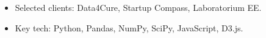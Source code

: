 \documentclass[10pt,a4paper,ragged2e,withhyper]{altacv}
\begin{document}
\begin{paracol}{2}
\divider

\begin{itemize}
\item Selected clients: Data4Cure, Startup Compass, Laboratorium EE.
\item Key tech: Python, Pandas, NumPy, SciPy, JavaScript, D3.js.
\end{itemize}











\end{paracol}
\end{document}
